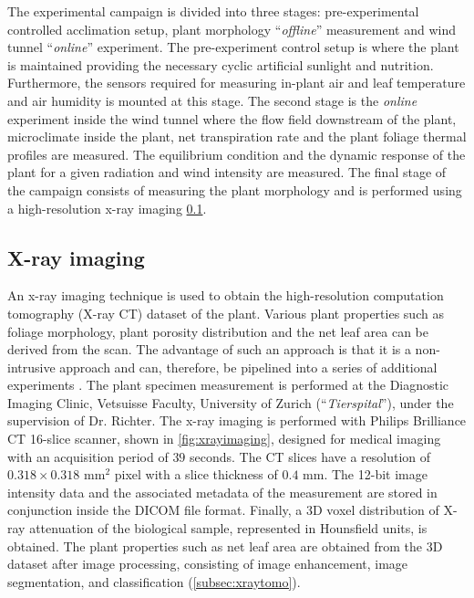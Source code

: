 The experimental campaign is divided into three stages: pre-experimental controlled acclimation setup, plant morphology ``\textit{offline}'' measurement and wind tunnel ``\textit{online}'' experiment. The pre-experiment control setup is where the plant is maintained providing the necessary cyclic artificial sunlight and nutrition. Furthermore, the sensors required for measuring in-plant air and leaf temperature and air humidity is mounted at this stage. The second stage is the \textit{online} experiment inside the wind tunnel where the flow field downstream of the plant, microclimate inside the plant, net transpiration rate and the plant foliage thermal profiles are measured. The equilibrium condition and the dynamic response of the plant for a given radiation and wind intensity are measured. The final stage of the campaign consists of measuring the plant morphology and is performed using a high-resolution x-ray imaging \cref{subsec:xray}.

\subsection{X-ray imaging}
\label{subsec:xray}
An x-ray imaging technique is used to obtain the high-resolution computation tomography (X-ray CT) dataset of the plant. Various plant properties such as foliage morphology, plant porosity distribution and the net leaf area can be derived from the scan. The advantage of such an approach is that it is a non-intrusive approach and can, therefore, be pipelined into a series of additional experiments \citep{Lal2017,Patera2018}. The plant specimen measurement is performed at the Diagnostic Imaging Clinic, Vetsuisse Faculty, University of Zurich (``\textit{Tierspital}''), under the supervision of Dr. Richter. The x-ray imaging is performed with Philips Brilliance CT 16-slice scanner, shown in \cref{fig:xrayimaging}, designed for medical imaging with an acquisition period of $39$ seconds. The CT slices have a resolution of $0.318\times0.318$  mm$^2$ pixel with a slice thickness of $0.4$ mm. The 12-bit image intensity data and the associated metadata of the measurement are stored in conjunction inside the DICOM file format. Finally, a 3D voxel distribution of X-ray attenuation of the biological sample, represented in Hounsfield units, is obtained. The plant properties such as net leaf area are obtained from the 3D dataset after image processing, consisting of image enhancement, image segmentation, and classification (\cref{subsec:xraytomo}). 

